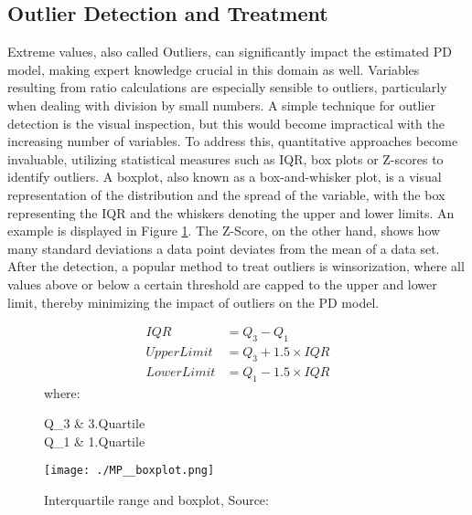 \subsection{Outlier Detection and Treatment}
\label{sec:OutlTr}
Extreme values, also called Outliers, can significantly impact the estimated PD model, making expert knowledge crucial in this domain as well. Variables resulting from ratio calculations are especially sensible to outliers, particularly when dealing with division by small numbers. A simple technique for outlier detection is the visual inspection, but this would become impractical with the increasing number of variables. To address this, quantitative approaches become invaluable, utilizing statistical measures such as \ac{IQR}, box plots or Z-scores to identify outliers. A boxplot, also known as a box-and-whisker plot, is a visual representation of the distribution and the spread of the variable, with the box representing the \ac{IQR} and the whiskers denoting the upper and lower limits. An example is displayed in Figure \ref{fig:dp_iqr_boxpl}. The Z-Score, on the other hand, shows how many standard deviations a data point deviates from the mean of a data set. After the detection, a popular method to treat outliers is winsorization, where all values above or below a certain threshold are capped to the upper and lower limit, thereby minimizing the impact of outliers on the PD model. \cite[p.~250]{Python:2022}

\begin{figure}[H]
\begin{minipage}{.5\textwidth}
	\begin{align} 
	IQR &= Q_3 - Q_1 \label{eq:dp_iqr_boxpl1}\\
	Upper Limit &= Q_3 + 1.5 \times IQR \label{eq:dp_iqr_boxpl2}\\
	Lower Limit &= Q_1 - 1.5 \times IQR \label{eq:dp_iqr_boxpl3}
	\end{align}
	where:
	\begin{conditions}
	Q_{3}  		& 3.Quartile \\
	Q_{1}  		& 1.Quartile \\
	\end{conditions}
\end{minipage}%
\begin{minipage}{.5\textwidth}
	\centering
	\texttt{[image: ./MP\_\_boxplot.png]}
\end{minipage}
    \caption{Interquartile range and boxplot, Source: \cite{Boxplot:2019}}
    \label{fig:dp_iqr_boxpl}
\end{figure}


